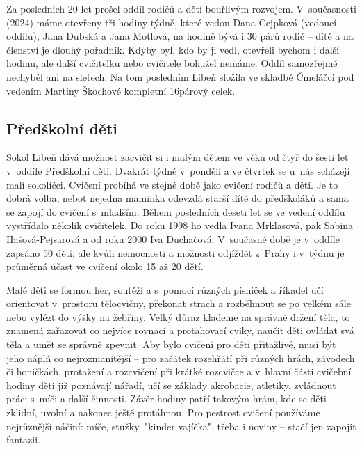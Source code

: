 \documentclass[a5paper, 11pt, twoside]{article}
\begin{document}
Za posledních 20 let prošel oddíl rodičů a dětí bouřlivým rozvojem.
V~současnosti (2024) máme otevřeny tři hodiny týdně, které vedou Dana
Cejpková (vedoucí oddílu), Jana Dubská a Jana Motlová, na hodině bývá i
30 párů rodič -- dítě a na členství je dlouhý pořadník. Kdyby byl, kdo
by ji vedl, otevřeli bychom i další hodinu, ale další cvičitelku nebo
cvičitele bohužel nemáme. Oddíl samozřejmě nechyběl ani na sletech. Na
tom posledním Libeň složila ve skladbě Čmeláčci pod vedením Martiny
Škochové kompletní 16párový celek.

\subsection{Předškolní děti}

Sokol Libeň dává možnost zacvičit si i malým dětem ve věku od čtyř do
šesti let v~oddíle Předškolní děti. Dvakrát týdně v~pondělí a ve čtvrtek
se u~nás scházejí malí sokolíčci. Cvičení probíhá ve stejné době jako
cvičení rodičů a dětí. Je to dobrá volba, neboť nejedna maminka odevzdá
starší dítě do předškoláků a sama se zapojí do cvičení s~mladším. Během
posledních deseti let se ve vedení oddílu vystřídalo několik cvičitelek.
Do roku 1998 ho vedla Ivana Mrklasová, pak Sabina Hašová-Pejsarová a od
roku 2000 Iva Duchačová. V~současné době je v~oddíle zapsáno 50 dětí,
ale kvůli nemocnosti a možnosti odjíždět z~Prahy i v~týdnu je průměrná
účast ve cvičení okolo 15 až 20 dětí.

Malé děti se formou her, soutěží a s~pomocí různých písniček a říkadel
učí orientovat v~prostoru tělocvičny, překonat strach a rozběhnout se po
velkém sále nebo vylézt do výšky na žebřiny. Velký důraz klademe na
správné držení těla, to znamená zařazovat co nejvíce rovnací a
protahovací cviky, naučit děti ovládat svá těla a umět se správně
zpevnit. Aby bylo cvičení pro děti přitažlivé, musí být jeho náplň co
nejrozmanitější -- pro začátek rozehřátí při různých hrách, závodech či
honičkách, protažení a rozcvičení při krátké rozcvičce a v~hlavní části
cvičební hodiny děti již poznávají nářadí, učí se základy akrobacie,
atletiky, zvládnout práci s~míči a další činnosti. Závěr hodiny patří
takovým hrám, kde se děti zklidní, uvolní a nakonec ještě protáhnou. Pro
pestrost cvičení používáme nejrůznější náčiní: míče, stužky, "kinder
vajíčka", třeba i noviny -- stačí jen zapojit fantazii.
\end{document}
